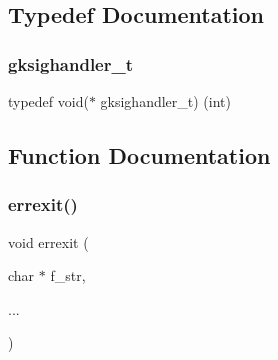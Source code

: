 \subsection{Typedef Documentation}
\mbox{\label{a00026_a783dab350e64ba521c464f693c54c33e}} 
\subsubsection{\texorpdfstring{gksighandler\+\_\+t}{gksighandler\_t}}
{\footnotesize\ttfamily typedef void($\ast$ gksighandler\+\_\+t) (int)}



\subsection{Function Documentation}
\mbox{\label{a00026_a56d0f2cc40cd8633a784582d6200d8b5}} 
\subsubsection{\texorpdfstring{errexit()}{errexit()}}
{\footnotesize\ttfamily void errexit (\begin{DoxyParamCaption}\item[{char $\ast$}]{f\+\_\+str,  }\item[{}]{... }\end{DoxyParamCaption})}

